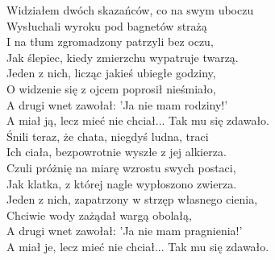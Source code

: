 \begin{text}
    Widziałem dwóch skazańców, co na swym uboczu\\
    Wysłuchali wyroku pod bagnetów strażą\\
    I na tłum zgromadzony patrzyli bez oczu,\\
    Jak ślepiec, kiedy zmierzchu wypatruje twarzą.\\
    Jeden z nich, licząc jakieś ubiegłe godziny,\\
    O widzenie się z ojcem poprosił nieśmiało,\\
    A drugi wnet zawołał: 'Ja nie mam rodziny!'\\
    A miał ją, lecz mieć nie chciał... Tak mu się zdawało.\\

    Śnili teraz, że chata, niegdyś ludna, traci\\
    Ich ciała, bezpowrotnie wyszłe z jej alkierza.\\
    Czuli próżnię na miarę wzrostu swych postaci,\\
    Jak klatka, z której nagle wypłoszono zwierza.\\
    Jeden z nich, zapatrzony w strzęp własnego cienia,\\
    Chciwie wody zażądał wargą obolałą,\\
    A drugi wnet zawołał: 'Ja nie mam pragnienia!'\\
    A miał je, lecz mieć nie chciał... Tak mu się zdawało.
\end{text}
